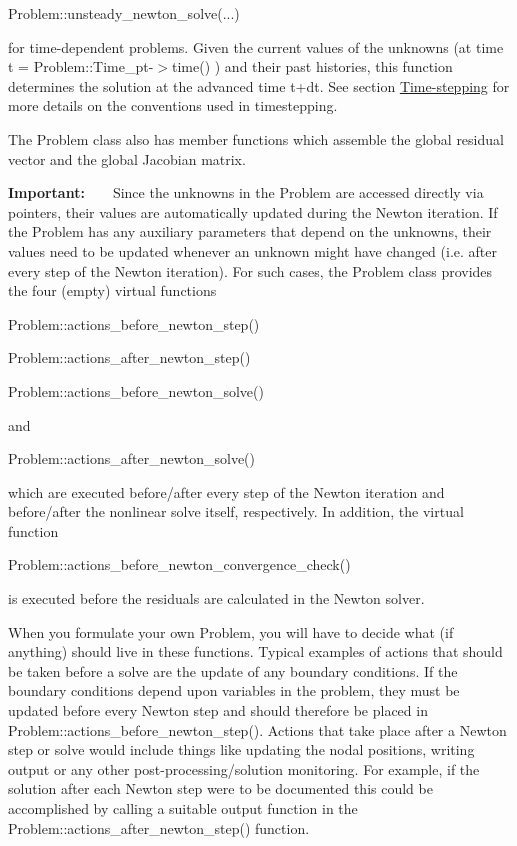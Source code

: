 \begin{DoxyEnumerate}
\begin{DoxyCode}
Problem::unsteady\_newton\_solve(...) 
\end{DoxyCode}
 for time-\/dependent problems. Given the current values of the unknowns (at time {\ttfamily t} = {\ttfamily Problem\+::\+Time\+\_\+pt-\/$>$time()} ) and their past histories, this function determines the solution at the advanced time {\ttfamily t+dt}. See section \hyperlink{index_timestepping}{Time-\/stepping} for more details on the conventions used in timestepping.
\end{DoxyEnumerate}The {\ttfamily Problem} class also has member functions which assemble the global residual vector and the global Jacobian matrix.

{\bfseries Important\+:} ~\newline
 ~\newline
 Since the unknowns in the {\ttfamily Problem} are accessed directly via pointers, their values are automatically updated during the Newton iteration. If the {\ttfamily Problem} has any auxiliary parameters that depend on the unknowns, their values need to be updated whenever an unknown might have changed (i.\+e. after every step of the Newton iteration). For such cases, the {\ttfamily Problem} class provides the four (empty) virtual functions 
\begin{DoxyCode}
Problem::actions\_before\_newton\_step() 
\end{DoxyCode}
 
\begin{DoxyCode}
Problem::actions\_after\_newton\_step() 
\end{DoxyCode}
 
\begin{DoxyCode}
Problem::actions\_before\_newton\_solve() 
\end{DoxyCode}
 and 
\begin{DoxyCode}
Problem::actions\_after\_newton\_solve() 
\end{DoxyCode}
 which are executed before/after every step of the Newton iteration and before/after the nonlinear solve itself, respectively. In addition, the virtual function 
\begin{DoxyCode}
Problem::actions\_before\_newton\_convergence\_check() 
\end{DoxyCode}
 is executed before the residuals are calculated in the Newton solver.

When you formulate your own {\ttfamily Problem}, you will have to decide what (if anything) should live in these functions. Typical examples of actions that should be taken before a solve are the update of any boundary conditions. If the boundary conditions depend upon variables in the problem, they must be updated before every Newton step and should therefore be placed in {\ttfamily Problem\+::actions\+\_\+before\+\_\+newton\+\_\+step()}. Actions that take place after a Newton step or solve would include things like updating the nodal positions, writing output or any other post-\/processing/solution monitoring. For example, if the solution after each Newton step were to be documented this could be accomplished by calling a suitable output function in the {\ttfamily Problem\+::actions\+\_\+after\+\_\+newton\+\_\+step()} function.

